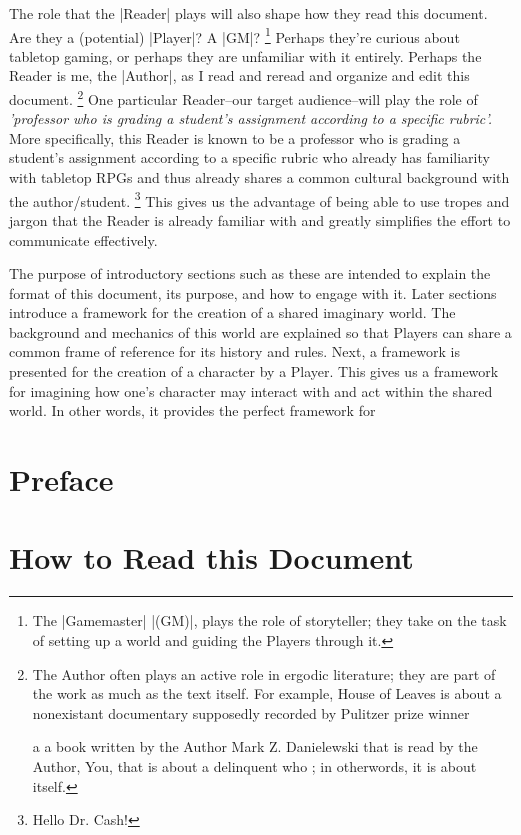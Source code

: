 \documentclass[10pt,twoside,twocolumn,openany,nomultitoc]{book}
\begin{document}
    The role that the |Reader| plays will also shape how they read this document. 
    Are they a (potential) |Player|? A |GM|?
        \footnote{The |Gamemaster|  |(GM)|, plays the role of storyteller; they take on the task of setting up a world and guiding the Players through it.} 
    Perhaps they're curious about tabletop gaming, or perhaps they are unfamiliar with it entirely. 
    Perhaps the Reader is me, the |Author|, as I read and reread and organize and edit this document.
        \footnote{The Author often plays an active role in ergodic literature; they are part of the work as much as the text itself.
        For example, \color{blue} House \color{black} of Leaves is about a nonexistant documentary supposedly recorded 
        by Pulitzer prize winner 
        
        a a book written by the Author Mark Z. Danielewski that is read by the Author, You, 
        that is about a delinquent who 
        ; in otherwords, it is about itself. }
    One particular Reader--our target audience--will play the role of \textit{'professor who is grading a student's assignment according to a specific rubric'.} 
    More specifically, this Reader is known to be a professor who is grading a student's assignment according to a specific rubric who already has familiarity 
    with tabletop RPGs and thus already shares a common cultural background with the author/student.
        \footnote{Hello Dr. Cash!} 
            This gives us the advantage of being able to use tropes and jargon that the Reader is already familiar with and greatly simplifies 
            the effort to communicate effectively.
    
    The purpose of introductory sections such as these are intended to explain the format of this document, its purpose, and how to engage with it. 
    Later sections introduce a framework for the creation of a shared imaginary world.  
    The background and mechanics of this world are explained so that Players can share a common frame of reference for its history and rules. 
    Next, a framework is presented for the creation of a character by a Player. 
    This gives us a framework for imagining how one's character may interact with and act within the shared world.
    In other words, it provides the perfect framework for \cite{dnd-gm-manual}

\section{Preface}
    \lipsum[1]
\section{How to Read this Document}
    \lipsum[2]
\end{document}

